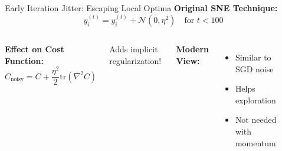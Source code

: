 \documentclass[aspectratio=169]{beamer}
\begin{document}
\begin{frame}{Early Iteration Jitter: Escaping Local Optima}
\textbf{Original SNE Technique:}
$$y_i^{(t)} = y_i^{(t)} + \mathcal{N}(0, \eta^2) \quad \text{for } t < 100$$

\begin{columns}
\textbf{Effect on Cost Function:}
$$C_{\text{noisy}} = C + \frac{\eta^2}{2}\text{tr}(\nabla^2 C)$$

Adds implicit regularization!

\textbf{Modern View:}
\begin{itemize}
\item Similar to SGD noise
\item Helps exploration
\item Not needed with momentum
\end{itemize}

\begin{center}
\end{center}
\end{columns}
\end{frame}
\end{document}
